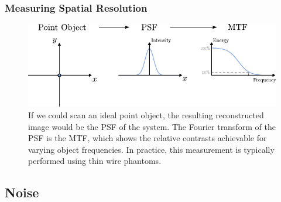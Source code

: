 \begin{frame}
	\frametitle{Measuring Spatial Resolution}

	\begin{figure}
		\begin{center}
			\includegraphics[width=0.9\linewidth]{images/resolution_1}
		\end{center}
		\caption{If we could scan an ideal point object, the resulting reconstructed image would be the PSF of the system. The Fourier transform of the PSF is the MTF, which shows the relative contrasts achievable for varying object frequencies. In practice, this measurement is typically  performed using thin wire phantoms.}
		\label{fig:ct_resolution_1}
	\end{figure}

\end{frame}

\subsection{Noise}



